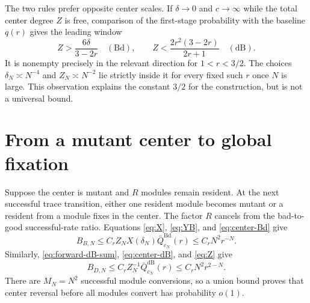 \documentclass[11pt]{article}
\theoremstyle{definition}
\theoremstyle{remark}
\newcommand{\Bd}{\mathrm{Bd}}
\newcommand{\dB}{\mathrm{dB}}
\begin{document}
The two rules prefer opposite center scales.  If $\delta\to0$ and
$c\to\infty$ while the total center degree $Z$ is free, comparison of the
first-stage probability with the baseline $q(r)$ gives the leading window
\begin{equation}
 Z>\frac{6\delta}{3-2r}\quad(\Bd),
 \qquad
 Z<\frac{2r^2(3-2r)}{2r+1}\quad(\dB).
 \label{eq:scale-window}
\end{equation}
It is nonempty precisely in the relevant direction for $1<r<3/2$.
The choices $\delta_N\asymp N^{-4}$ and $Z_N\asymp N^{-2}$ lie strictly
inside it for every fixed such $r$ once $N$ is large.  This observation
explains the constant $3/2$ for the construction, but is not a universal
bound.

\section{From a mutant center to global fixation}

Suppose the center is mutant and $R$ modules remain resident.  At the next
successful trace transition, either one resident module becomes mutant or a
resident from a module fixes in the center.  The factor $R$ cancels from the
bad-to-good successful-rate ratio.  Equations
\eqref{eq:X}, \eqref{eq:YB}, and \eqref{eq:center-Bd} give
\begin{equation}
 B_{B,N}\leq C_rZ_NX(\delta_N)\bar Q_{c_N}^{\Bd}(r)
 \leq C_rN^2r^{-N}.
 \label{eq:sweep-Bd}
\end{equation}
Similarly, \eqref{eq:forward-dB-sum}, \eqref{eq:center-dB}, and
\eqref{eq:Z} give
\begin{equation}
 B_{D,N}\leq C_rZ_N^{-1}\bar Q_{c_N}^{\dB}(r)
 \leq C_rN^2r^{2-N}.
 \label{eq:sweep-dB}
\end{equation}
There are $M_N=N^2$ successful module conversions, so a union bound proves
that center reversal before all modules convert has probability $o(1)$.
\end{document}
